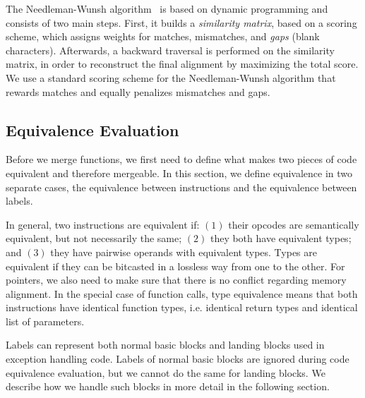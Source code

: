 The Needleman-Wunsh algorithm~\cite{needleman70} is based on dynamic programming and consists of two main steps. First, it builds a \textit{similarity matrix}, based on a scoring scheme, which assigns weights
for matches, mismatches, and \textit{gaps} (blank characters). Afterwards, a backward traversal is performed on the similarity matrix, in
order to reconstruct the final alignment by maximizing the total score. We use a standard scoring scheme for the Needleman-Wunsh algorithm
that rewards matches and equally penalizes mismatches and gaps.



\subsection{Equivalence Evaluation}

Before we merge functions, we first need to define what makes two pieces of code equivalent and
therefore mergeable. In this section, we define equivalence in two separate cases, the equivalence
between instructions and the equivalence between labels.

In general, two instructions are equivalent if: $(1)$ their opcodes are semantically equivalent,
but not necessarily the same; $(2)$ they both have equivalent types; and $(3)$ they have pairwise
operands with equivalent types. Types are equivalent if they can be bitcasted in a lossless way from one to
the other. For pointers, we also need to make sure that there is no conflict regarding memory alignment.
In the special case of function calls, type equivalence means that both instructions have identical
function types, i.e. identical return types and identical list of parameters.

Labels can represent both normal basic blocks and landing blocks used in exception handling code.
Labels of normal basic blocks are ignored during code equivalence evaluation, but we cannot do the
same for landing blocks. We describe how we handle such blocks in more detail in the following section.

